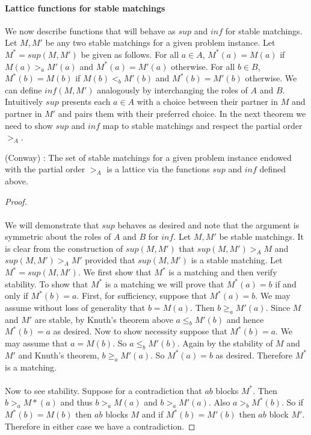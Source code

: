 \paragraph{Lattice functions for stable matchings} We now describe functions that will behave as $sup$ and $inf$ for stable matchings. Let $M, M'$ be any two stable matchings for a given problem instance. Let $M^* = sup(M,M')$ be given as follows. For all $a \in A$, $M^*(a) = M(a)$ if $M(a) >_a M'(a)$ and $M^*(a) = M'(a)$ otherwise. For all $b \in B$, $M^*(b) = M(b)$ if $M(b) <_b M'(b)$ and $M^*(b) = M'(b)$ otherwise. We can define $inf(M,M')$ analogously by interchanging the roles of $A$ and $B$. Intuitively $sup$  presents each $a \in A$ with a choice between their partner in $M$ and partner in $M'$ and pairs them with their preferred choice. In the next theorem we need to show $sup$ and $inf$ map to stable matchings and respect the partial order $>_A$.
\begin{theorem}(Conway) \cite{knuthmariages}: The set of stable matchings for a given problem instance endowed with the partial order $>_A$ is a lattice via the functions $sup$ and $inf$ defined above.
\end{theorem}
\begin{proof}
\paragraph{}
We will demonstrate that $sup$ behaves as desired and note that the argument is symmetric about the roles of $A$ and $B$ for $inf$. Let $M, M'$ be stable matchings. It is clear from the construction of $sup(M,M')$ that $sup(M,M') >_A M$ and $sup(M,M') >_A M'$ provided that $sup(M,M')$ is a stable matching. Let $M^* = sup(M,M')$. We first show that $M^*$ is a matching and then verify stability. To show that $M^*$ is a matching we will prove that $M^*(a) = b$ if and only if $M^*(b) = a$. First, for sufficiency, suppose that $M^*(a) = b$.  We may assume without loss of generality that $b = M(a)$. Then $b \geq_a M'(a)$. Since $M$ and $M'$ are stable, by Knuth's theorem above $a \leq_b M'(b)$ and hence $M^*(b) = a$ as desired. Now to show necessity suppose that $M^*(b) = a$. We may assume that $a = M(b)$. So $a \leq_b M'(b)$. Again by the stability of $M$ and $M'$ and Knuth's theorem, $b \geq_a M'(a)$. So $M^*(a)  = b$ as desired. Therefore $M^*$ is a matching. 
\paragraph{}
Now to see stability. Suppose for a contradiction that $ab$ blocks $M^*$. Then $b >_a M*(a)$ and thus $b>_a M(a)$ and $b >_a M'(a)$. Also $a >_b M^*(b)$. So if $M^*(b) = M(b)$ then $ab$ blocks $M$ and if $M^*(b) = M'(b)$ then $ab$ block $M'$. Therefore in either case we have  a contradiction. \end{proof}
